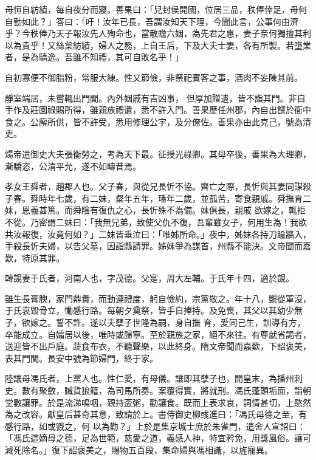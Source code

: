 \begin{pinyinscope}
 母恒自紡績，每自夜分而寢。善果曰：「兒封侯開國，位居三品，秩俸倖足，母何自勤如此？」答曰：「吁！汝年已長，吾謂汝知天下理，今聞此言，公事何由濟乎？今秩俸乃天子報汝先人殉命也，當散贍六姻，為先君之惠，妻子奈何獨擅其利以為貴乎！又絲枲紡績，婦人之務，上自王后，下及大夫士妻，各有所製。若墮業者，是為驕逸。吾雖不知禮，其可自敗名乎！」



 自初寡便不御脂粉，常服大練。性又節儉，非祭祀賓客之事，酒肉不妄陳其前。



 靜室端居，未嘗輒出門閭。內外姻戚有吉凶事，
 但厚加贈遺，皆不詣其門。非自手作及莊園祿賜所得，雖親族禮遺，悉不許入門。善果歷任州郡，內自出饌於衙中食之。公廨所供，皆不許受，悉用修理公宇，及分僚佐。善果亦由此克己，號為清吏。



 煬帝遣御史大夫張衡勞之，考為天下最。征授光祿卿。其母卒後，善果為大理卿，漸驕恣，公清平允，遂不如疇昔焉。



 孝女王舜者，趙郡人也。父子春，與從兄長忻不協。齊亡之際，長忻與其妻同謀殺子春。舜時年七歲，有二妹，粲年五年，璠年二歲，並孤苦，寄食親戚。舜撫育二妹，恩義甚篤。而舜陰有復仇之心，長忻殊不為備。妹俱長，親戚
 欲嫁之，輒拒不從。乃密謂二妹曰：「我無兄弟，致使父仇不復，吾輩雖女子，何用生為！我欲共汝報復，汝竟何如？」二妹皆垂泣曰：「唯姊所命。」夜中，姊妹各持刀踰牆入，手殺長忻夫婦，以告父墓，因詣縣請罪。姊妹爭為謀首，州縣不能決。文帝聞而嘉歎，特原其罪。



 韓覬妻于氏者，河南人也，字茂德。父寔，周大左輔。于氏年十四，適於覬。



 雖生長膏腴，家門鼎貴，而動遵禮度，躬自儉約，宗黨敬之。年十八，覬從軍沒，于氏哀毀骨立，慟感行路。每朝夕奠祭，皆手自捧持。及免喪，其父以其幼少無子，欲嫁之。誓不許。遂以夫孽子世隆為嗣，身自撫
 育，愛同己生，訓導有方，卒能成立。自孀居以後，唯時或歸寧。至於親族之家，絕不來往。有尊就省謁者，送迎皆不出戶庭。蔬食布衣，不聽聲樂，以此終身。隋文帝聞而嘉歎，下詔褒美，表其門閭。長安中號為節婦門，終于家。



 陸讓母馮氏者，上黨人也。性仁愛，有母儀。讓即其孽子也，開皇末，為播州刺史。數有聚斂，贓貨狼籍，為司馬所奏。案覆得實，將就刑。馮氏蓬頭垢面，詣朝堂數讓罪。於是流涕鳴咽，親持盃粥，勸讓食。既而上表求哀，詞情甚切，上愍然為之改容。獻皇后甚奇其意，致請於上。書侍御史柳彧進曰：「馮氏母德之至，有感行路，如或戮之，何
 以為勸？」上於是集京城士庶於朱雀門，遣舍人宣詔曰：「馮氏這嫡母之德，足為世範，慈愛之道，義感人神，特宜矜免，用獎風俗。讓可減死除名。」復下詔褒美之，賜物五百段，集命婦與馮相識，以旌寵異。




\end{pinyinscope}
